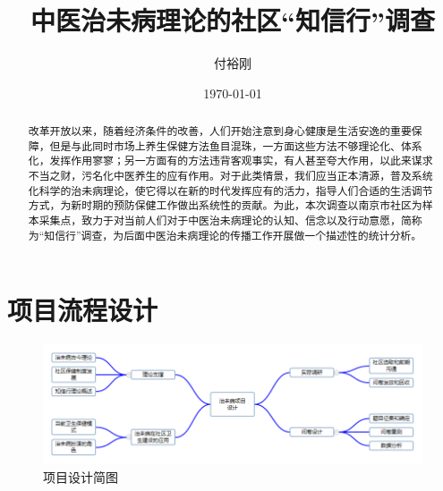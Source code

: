 \documentclass{ctexart}
\title{中医治未病理论的社区“知信行”调查}
\author{付裕刚}
\date{\today}
\begin{document}
	\maketitle
	\begin{abstract}
	改革开放以来，随着经济条件的改善，人们开始注意到身心健康是生活安逸的重要保障，但是与此同时市场上养生保健方法鱼目混珠，一方面这些方法不够理论化、体系化，发挥作用寥寥；另一方面有的方法违背客观事实，有人甚至夸大作用，以此来谋求不当之财，污名化中医养生的应有作用。对于此类情景，我们应当正本清源，普及系统化科学的治未病理论，使它得以在新的时代发挥应有的活力，指导人们合适的生活调节方式，为新时期的预防保健工作做出系统性的贡献。为此，本次调查以南京市社区为样本采集点，致力于对当前人们对于中医治未病理论的认知、信念以及行动意愿，简称为“知信行”调查，为后面中医治未病理论的传播工作开展做一个描述性的统计分析。
	\end{abstract}
\tableofcontents
\section{项目流程设计}

\begin{figure}[th]
	\includegraphics[width=\textwidth]{process.png}
	\centering
	\caption{项目设计简图}
\end{figure}

\printbibliography

\end{document}
